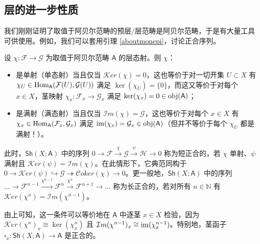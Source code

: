 \subsection{层的进一步性质}\label{ch5.2}


我们刚刚证明了取值于阿贝尔范畴的预层/层范畴是阿贝尔范畴，于是有大量工具可供使用。例如，我们可以套用引理 \ref{aboutmonepi}，讨论正合序列。

\begin{Lem}\label{aboutmonepisheaves}
设 $\chi:\mathcal{F}\rightarrow\mathcal{G}$ 为取值于阿贝尔范畴 $\mathsf{A}$ 的层态射。则 $\chi$：
\begin{itemize}[leftmargin=0.5cm]
	\item 是单射\textup{（单态射）}当且仅当 $\mathcal{K}er(\chi)=0$，这也等价于对一切开集 $U\subset X$ 有 $\chi_U\in\textup{Hom}_\mathsf{A}(\mathcal{F}(U),\mathcal{G}(U))$ 满足 $\ker(\chi_U)=\{0\}$，而这又等价于对每个 $x\in X$，茎映射 $\chi_x:\mathcal{F}_x\rightarrow\mathcal{G}_x$ 满足 $\ker(\chi_x)=0\in\textup{obj}(\mathsf{A})$；
	
	\item 是满射\textup{（满态射）}当且仅当 $\mathcal{I}m(\chi)=\mathcal{G}$，这也等价于对每个 $x\in X$ 有 $\chi_x\in\textup{Hom}_\mathsf{A}(\mathcal{F}_x,\mathcal{G}_x)$ 满足 $\textup{im}(\chi_x)=\mathcal{G}_x\in\textup{obj}(\mathsf{A})$\textup{（但并不等价于每个 $\chi_U$ 都是满射！）}。
\end{itemize}
\vspace*{-0.1cm}
此时，$\mathsf{Sh}(X;\mathsf{A})$ 中的序列 $0\rightarrow\mathcal{F}\xrightarrow{\chi}\mathcal{G}\xrightarrow{\psi}\mathcal{H}\rightarrow 0$ 称为\textup{短正合}的，若 $\chi$ 单射、$\psi$ 满射且 $\mathcal{K}er(\psi)=\mathcal{I}m(\chi)$。在此情形下，它典范同构于 $0\rightarrow\mathcal{K}er(\psi)\hookrightarrow\mathcal{G}\twoheadrightarrow\mathcal{C}oker(\chi)\rightarrow 0$。更一般地，$\mathsf{Sh}(X;\mathsf{A})$ 中的序列 $...\rightarrow\mathcal{F}^{n-1}\xrightarrow{\chi^{n-1}}\mathcal{F}^n\xrightarrow{\chi^n}\mathcal{F}^{n+1}\rightarrow...$ 称为\textup{长正合}的，若对所有 $n\in\mathbb{N}$ 有 $\mathcal{K}er(\chi^n)=\mathcal{I}m(\chi^{n-1})$。

由上可知，这一条件可以等价地在 $\mathsf{A}$ 中逐茎 $x\in X$ 检验，因为 $\mathcal{K}er(\chi^n)_x\cong\ker(\chi_x^n)$ 且 $\mathcal{I}m(\chi^{n-1})_x\cong\textup{im}(\chi_x^{n-1})$。特别地，茎函子 $\square_x:\mathsf{Sh}(X;\mathsf{A})\rightarrow\mathsf{A}$ 是正合的。
\end{Lem}  

